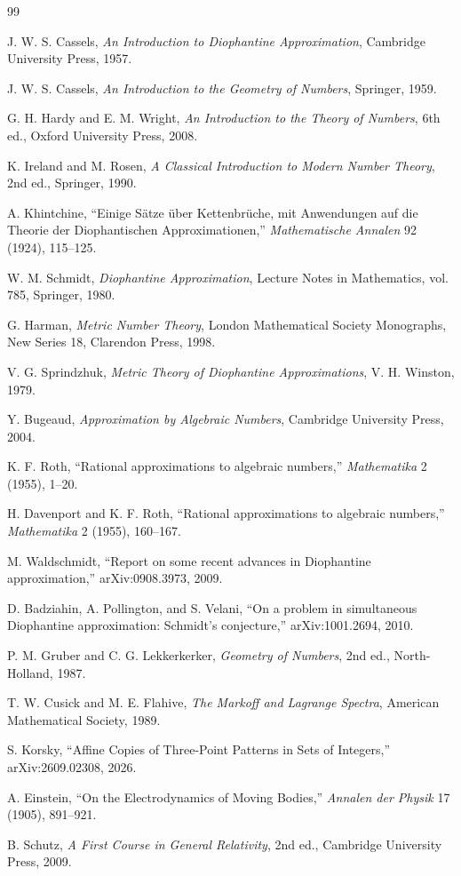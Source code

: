 \documentclass[11pt,a4paper]{article}
\begin{document}
\begin{thebibliography}{99}

J. W. S. Cassels,
\emph{An Introduction to Diophantine Approximation},
Cambridge University Press, 1957.

J. W. S. Cassels,
\emph{An Introduction to the Geometry of Numbers},
Springer, 1959.

G. H. Hardy and E. M. Wright,
\emph{An Introduction to the Theory of Numbers},
6th ed., Oxford University Press, 2008.

K. Ireland and M. Rosen,
\emph{A Classical Introduction to Modern Number Theory},
2nd ed., Springer, 1990.

A. Khintchine,
``Einige Sätze über Kettenbrüche, mit Anwendungen auf die Theorie der Diophantischen Approximationen,''
\emph{Mathematische Annalen} 92 (1924), 115--125.

W. M. Schmidt,
\emph{Diophantine Approximation},
Lecture Notes in Mathematics, vol. 785, Springer, 1980.

G. Harman,
\emph{Metric Number Theory},
London Mathematical Society Monographs, New Series 18, Clarendon Press, 1998.

V. G. Sprindzhuk,
\emph{Metric Theory of Diophantine Approximations},
V. H. Winston, 1979.

Y. Bugeaud,
\emph{Approximation by Algebraic Numbers},
Cambridge University Press, 2004.

K. F. Roth,
``Rational approximations to algebraic numbers,''
\emph{Mathematika} 2 (1955), 1--20.

H. Davenport and K. F. Roth,
``Rational approximations to algebraic numbers,''
\emph{Mathematika} 2 (1955), 160--167.

M. Waldschmidt,
``Report on some recent advances in Diophantine approximation,''
arXiv:0908.3973, 2009.

D. Badziahin, A. Pollington, and S. Velani,
``On a problem in simultaneous Diophantine approximation: Schmidt's conjecture,''
arXiv:1001.2694, 2010.

P. M. Gruber and C. G. Lekkerkerker,
\emph{Geometry of Numbers}, 2nd ed., North-Holland, 1987.

T. W. Cusick and M. E. Flahive,
\emph{The Markoff and Lagrange Spectra},
American Mathematical Society, 1989.

S. Korsky,
``Affine Copies of Three-Point Patterns in Sets of Integers,''
arXiv:2609.02308, 2026.

A. Einstein,
``On the Electrodynamics of Moving Bodies,''
\emph{Annalen der Physik} 17 (1905), 891--921.

B. Schutz,
\emph{A First Course in General Relativity},
2nd ed., Cambridge University Press, 2009.

\end{thebibliography}
\end{document}
